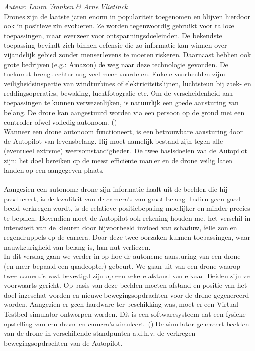 {\em Auteur: Laura Vranken \& Arne Vlietinck}\\

\noindent
Drones zijn de laatste jaren enorm in populariteit toegenomen en blijven hierdoor ook in positieve zin evolueren. Ze worden tegenwoordig gebruikt voor talloze toepassingen, maar evenzeer voor ontspanningsdoeleinden. De bekendste toepassing bevindt zich binnen defensie die zo informatie kan winnen over vijandelijk gebied zonder mensenlevens te moeten riskeren. Daarnaast hebben ook grote bedrijven (e.g.: Amazon) de weg naar deze technologie gevonden. De toekomst brengt echter nog veel meer voordelen. Enkele voorbeelden zijn: veiligheidsinspectie van windturbines of elektriciteitslijnen, luchtsteun bij zoek- en reddingsoperaties, bewaking, luchtfotografie etc. Om de verscheidenheid aan toepassingen te kunnen verwezenlijken, is natuurlijk een goede aansturing van belang. De drone kan aangestuurd worden via een persoon op de grond met een controller ofwel volledig autonoom. (\cite{website:microdrones})
\\
Wanneer een drone autonoom functioneert, is een betrouwbare aansturing door de Autopilot van levensbelang. Hij moet namelijk bestand zijn tegen alle (eventueel extreme) weersomstandigheden. De twee basisdoelen van de Autopilot zijn: het doel bereiken op de meest efficiënte manier en de drone veilig laten landen op een aangegeven plaats.
\\
\\
Aangezien een autonome drone zijn informatie haalt uit de beelden die hij produceert, is de kwaliteit van de camera's van groot belang. Indien geen goed beeld verkregen wordt, is de relatieve positiebepaling moeilijker en minder precies te bepalen. Bovendien moet de Autopilot ook rekening houden met het verschil in intensiteit van de kleuren door bijvoorbeeld invloed van schaduw, felle zon en regendruppels op de camera. Door deze twee oorzaken kunnen toepassingen, waar nauwkeurigheid van belang is, hun nut verliezen. 
\\
In dit verslag gaan we verder in op hoe de autonome aansturing van een drone (en meer bepaald een quadcopter) gebeurt. We gaan uit van een drone waarop twee camera's vast bevestigd zijn op een zekere afstand van elkaar. Beiden zijn ze voorwaarts gericht. Op basis van deze beelden moeten afstand en positie van het doel ingeschat worden en nieuwe bewegingsopdrachten voor de drone gegenereerd worden. Aangezien er geen hardware ter beschikking was, moet er een Virtual Testbed simulator ontworpen worden. Dit is een softwaresysteem dat een fysieke opstelling van een drone en camera's simuleert. (\cite{arcticle:opgavePeno}) De simulator genereert beelden van de drone in verschillende standpunten a.d.h.v. de verkregen bewegingsopdrachten van de Autopilot. 
